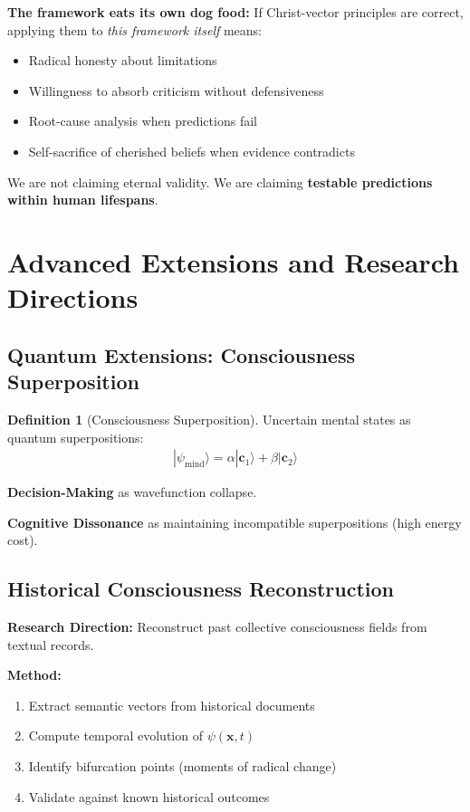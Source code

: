 \documentclass[11pt,a4paper]{article}
\theoremstyle{definition}
\newtheorem{definition}{Definition}[section]
\theoremstyle{remark}
\newcommand{\cc}{\mathbf{c}}
\begin{document}
\begin{mdframed}[backgroundcolor=green!5]
\textbf{The framework eats its own dog food:} If Christ-vector principles are correct, applying them to \textit{this framework itself} means:
\begin{itemize}
\item Radical honesty about limitations
\item Willingness to absorb criticism without defensiveness  
\item Root-cause analysis when predictions fail
\item Self-sacrifice of cherished beliefs when evidence contradicts
\end{itemize}

We are not claiming eternal validity. We are claiming \textbf{testable predictions within human lifespans}.
\end{mdframed}

\section{Advanced Extensions and Research Directions}

\subsection{Quantum Extensions: Consciousness Superposition}

\begin{definition}[Consciousness Superposition]
Uncertain mental states as quantum superpositions:
\begin{align}
|\psi_{\text{mind}}\rangle = \alpha |\cc_1\rangle + \beta |\cc_2\rangle
\end{align}

\textbf{Decision-Making} as wavefunction collapse.

\textbf{Cognitive Dissonance} as maintaining incompatible superpositions (high energy cost).
\end{definition}

\subsection{Historical Consciousness Reconstruction}

\textbf{Research Direction:} Reconstruct past collective consciousness fields from textual records.

\textbf{Method:}
\begin{enumerate}
\item Extract semantic vectors from historical documents
\item Compute temporal evolution of $\psi(\mathbf{x}, t)$
\item Identify bifurcation points (moments of radical change)
\item Validate against known historical outcomes
\end{enumerate}
\end{document}
